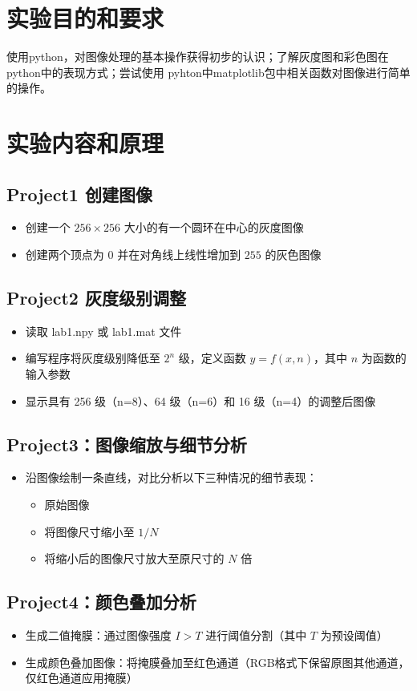 \documentclass[10.5pt]{config}
\date{2025年2月27日}
\begin{document}
\makeheader %


\section{实验目的和要求}
使用python，对图像处理的基本操作获得初步的认识；了解灰度图和彩色图在python中的表现方式；尝试使用
pyhton中matplotlib包中相关函数对图像进行简单的操作。
\section{实验内容和原理}
\subsection{Project1 创建图像}
\begin{itemize}
    \item 创建一个 $256 \times 256$ 大小的有一个圆环在中心的灰度图像
    \item 创建两个顶点为 $0$ 并在对角线上线性增加到 $255$ 的灰色图像
\end{itemize}
\subsection{Project2 灰度级别调整}
\begin{itemize}
    \item 读取 lab1.npy 或 lab1.mat 文件
    \item 编写程序将灰度级别降低至 $2^n$ 级，定义函数 $y = f(x, n)$，其中 $n$ 为函数的输入参数
    \item 显示具有 256 级（n=8）、64 级（n=6）和 16 级（n=4）的调整后图像
\end{itemize}
\subsection{Project3：图像缩放与细节分析}
\begin{itemize}
    \item 沿图像绘制一条直线，对比分析以下三种情况的细节表现：
    \begin{itemize}
        \item 原始图像
        \item 将图像尺寸缩小至 $1/N$
        \item 将缩小后的图像尺寸放大至原尺寸的 $N$ 倍
    \end{itemize}
\end{itemize}
\subsection{Project4：颜色叠加分析}
\begin{itemize}
    \item 生成二值掩膜：通过图像强度 $I > T$ 进行阈值分割（其中 $T$ 为预设阈值）
    \item 生成颜色叠加图像：将掩膜叠加至红色通道（RGB格式下保留原图其他通道，仅红色通道应用掩膜）
\end{itemize}
\end{document}
